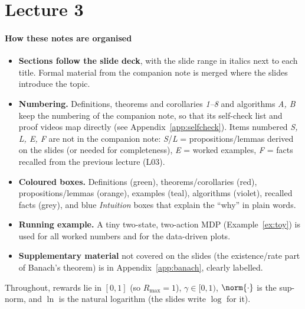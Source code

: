 \documentclass[11pt,a4paper]{article}
\theoremstyle{plain}
\theoremstyle{definition}
\theoremstyle{remark}
\begin{document}
\newpage

\setcounter{section}{0}
\renewcommand{\thesection}{\arabic{section}}
\part{Lecture 3}

\begin{abstract}\noindent
This lecture answers the question left open by the MDP lectures: \emph{how do we actually compute} $V^\pi$ and, above all, the optimal policy $\pi^*$?
We first compute $V^\pi$ exactly (a linear system) and iteratively (a fixed-point iteration), introduce \emph{contraction mappings} as the tool that makes iteration converge, show that both Bellman backups are $\gamma$-contractions, and conclude with \textbf{value iteration}, its convergence rate, the quality of the greedy policy it returns, and the number of iterations needed for an $\epsilon$-optimal policy.
\end{abstract}

\subsection*{How these notes are organised}
\begin{itemize}
  \item \textbf{Sections follow the slide deck}, with the slide range in italics next to each title. Formal material from the companion note is merged where the slides introduce the topic.
  \item \textbf{Numbering.} Definitions, theorems and corollaries \emph{1--8} and algorithms \emph{A, B} keep the numbering of the companion note, so that its self-check list and proof videos map directly (see Appendix~\ref{app:selfcheck}). Items numbered \emph{S, L, E, F} are not in the companion note: \emph{S}/\emph{L} = propositions/lemmas derived on the slides (or needed for completeness), \emph{E} = worked examples, \emph{F} = facts recalled from the previous lecture (L03).
  \item \textbf{Coloured boxes.} Definitions (green), theorems/corollaries (red), propositions/lemmas (orange), examples (teal), algorithms (violet), recalled facts (grey), and blue \emph{Intuition} boxes that explain the ``why'' in plain words.
  \item \textbf{Running example.} A tiny two-state, two-action MDP (Example~\ref{ex:toy}) is used for all worked numbers and for the data-driven plots.
  \item \textbf{Supplementary material} not covered on the slides (the existence/rate part of Banach's theorem) is in Appendix~\ref{app:banach}, clearly labelled.
\end{itemize}
Throughout, rewards lie in $[0,1]$ (so $R_{\max}=1$), $\gamma\in[0,1)$, $\norm{\cdot}$ is the sup-norm, and $\ln$ is the natural logarithm (the slides write $\log$ for it).
\end{document}
